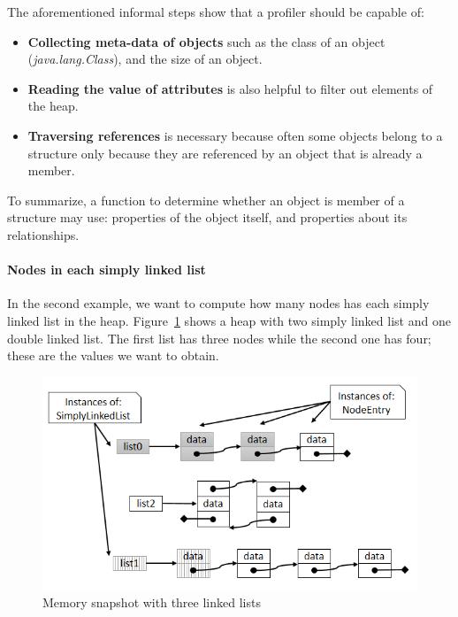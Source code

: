 The aforementioned informal steps show that a profiler should be capable of:

\begin{itemize}
\item \textbf{Collecting meta-data of objects} such as the class of an object (\textit{java.lang.Class}), and the size of an object. 

\item \textbf{Reading the value of attributes} is also helpful to filter out elements of the heap.

\item \textbf{Traversing references} is necessary because often some objects belong to a structure only because they are referenced by an object that is already a member.
\end{itemize}

To summarize, a function to determine whether an object is member of a structure may use: properties of the object itself, and properties about its relationships.



\paragraph{Nodes in each simply linked list}

In the second example, we want to compute how many nodes has each simply linked list in the heap.
Figure~\ref{fig:simple_snapshot} shows a heap with two simply linked list and one double linked list.
The first list has three nodes while the second one has four; these are the values we want to obtain.


\begin{figure}[!ht]
\centering
\includegraphics[width=0.65\linewidth]{chapter6/fig/lists}
\caption{Memory snapshot with three linked lists}
\label{fig:simple_snapshot}
\end{figure}


